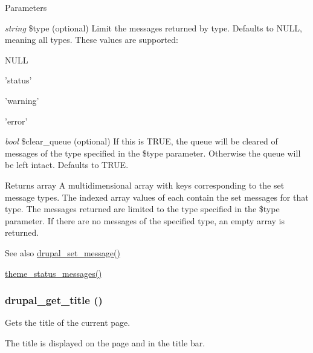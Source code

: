 \begin{DoxyParams}{Parameters}
\item[{\em string}]\$type (optional) Limit the messages returned by type. Defaults to NULL, meaning all types. These values are supported:
\begin{DoxyItemize}
\item NULL
\item 'status'
\item 'warning'
\item 'error' 
\end{DoxyItemize}\item[{\em bool}]\$clear\_\-queue (optional) If this is TRUE, the queue will be cleared of messages of the type specified in the \$type parameter. Otherwise the queue will be left intact. Defaults to TRUE.\end{DoxyParams}
\begin{DoxyReturn}{Returns}
array A multidimensional array with keys corresponding to the set message types. The indexed array values of each contain the set messages for that type. The messages returned are limited to the type specified in the \$type parameter. If there are no messages of the specified type, an empty array is returned.
\end{DoxyReturn}
\begin{DoxySeeAlso}{See also}
\hyperlink{bootstrap_8inc_ad9223d86c7b08b1288274ce211d9bfa6}{drupal\_\-set\_\-message()} 

\hyperlink{group__themeable_gad29a18ad4d19a5fc0a3c75a8804f0331}{theme\_\-status\_\-messages()} 
\end{DoxySeeAlso}
\hypertarget{bootstrap_8inc_a88f660bf675e572de22a8469841bbd08}{
\subsubsection[{drupal\_\-get\_\-title}]{\setlength{\rightskip}{0pt plus 5cm}drupal\_\-get\_\-title ()}}
\label{bootstrap_8inc_a88f660bf675e572de22a8469841bbd08}
Gets the title of the current page.

The title is displayed on the page and in the title bar.

